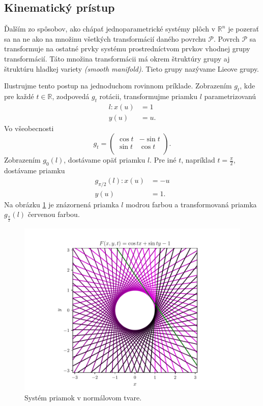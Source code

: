 \subsection{Kinematický prístup}
Ďalším zo spôsobov, ako chápať jednoparametrické systémy plôch v $\mathbb{R}^n$ je pozerať sa na ne ako na množinu všetkých transformácií daného povrchu $\mathcal{P}$. Povrch $\mathcal{P}$ sa transformuje na ostatné prvky systému prostredníctvom prvkov vhodnej grupy transformácií. Táto množina transformácii má okrem štruktúry grupy aj štruktúru hladkej variety \textit{(smooth manifold)}. Tieto grupy nazývame Lieove grupy.

\begin{example}
Ilustrujme tento postup na jednoduchom rovinnom príklade. Zobrazením $g_t$, kde pre každé $t \in \mathbb{R}$, zodpovedá $g_t$ rotácii, transformujme priamku $l$  parametrizovanú
\begin{align*}
l \colon x(u) &= 1 \\
y(u) &= u. 
\end{align*}
Vo všeobecnosti 
$$
g_t = \begin{pmatrix}
\cos t & -\sin t  \\
\sin t & \cos t  \\
\end{pmatrix}.
$$
Zobrazením $g_0(l)$, dostávame opäť priamku $l$. Pre iné $t$, napríklad $t = \frac{\pi}{2}$, dostávame priamku 
\begin{align*}
g_{\pi/2}(l) \colon x(u) &= -u \\
y(u) &= 1.
\end{align*}
Na obrázku \ref{fig:lines_in_normal_form} je znázornená priamka $l$ modrou farbou a transformovaná priamka $g_{\frac{\pi}{2}}(l)$ červenou farbou. 

\begin{figure}[h]
	\centering
	\includegraphics[trim={0 0.35cm 0 0.85cm},clip]{images/lines_in_normal_form.pdf}
	\caption{Systém priamok v normálovom tvare.}
	\label{fig:lines_in_normal_form}
\end{figure}
\end{example}

